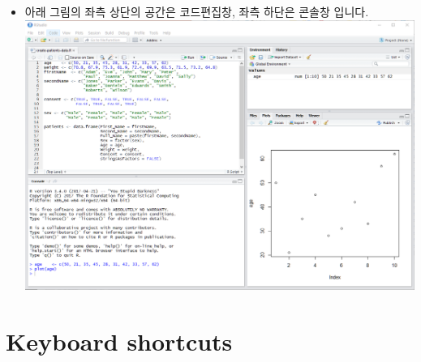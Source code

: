 \documentclass[
]{book}
\providecommand{\tightlist}{%
  \setlength{\itemsep}{0pt}\setlength{\parskip}{0pt}}
\begin{document}
\begin{itemize}
\tightlist
\item
  아래 그림의 좌측 상단의 공간은 코드편집창, 좌측 하단은 콘솔창 입니다.
  \includegraphics{images/01/01-11.PNG}
\end{itemize}

\hypertarget{keyboard-shortcuts}{%
\section{Keyboard shortcuts}\label{keyboard-shortcuts}}
\end{document}
